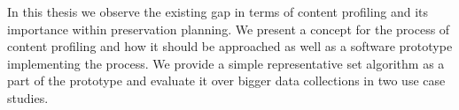 In this thesis we observe the existing gap in terms of content profiling and its importance within preservation
planning. 
We present a concept for the process of content profiling and how it should be approached as well as a software prototype implementing the process.
 We provide a simple representative set algorithm as a part of the prototype and evaluate it over bigger data collections in two use case studies.